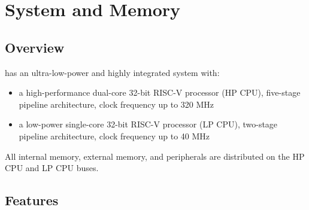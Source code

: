 \documentclass[main\_\_EN.tex]{subfiles}
\begin{document}
\setenglishformatting

\ifglobal
\else
    \clearpage
    \listoftodos
    \listofdonetodos
    \tableofcontents
\fi



\hypertarget{sysmem}{}
\chapter{System and Memory}
\label{mod:sysmem}

\section{Overview}
\chipname{} has an ultra-low-power and highly integrated system with:
\begin{itemize}
    \item a high-performance dual-core 32-bit RISC-V processor (HP CPU), five-stage pipeline architecture, clock frequency up to 320 MHz
    \item a low-power single-core 32-bit RISC-V processor (LP CPU), two-stage pipeline architecture, clock frequency up to 40 MHz
\end{itemize}

All internal memory, external memory, and peripherals are distributed on the HP CPU and LP CPU buses.

\section{Features}
\end{document}
